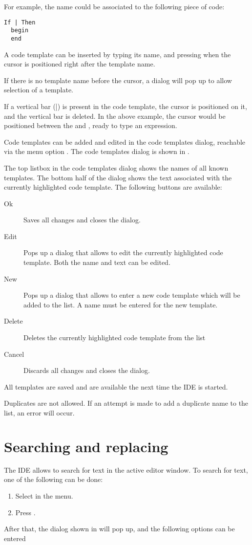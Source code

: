 For example, the name  could be associated to the following
piece of code:
\begin{verbatim}
If | Then
  begin
  end
\end{verbatim}
A code template can be inserted by typing its name, and pressing 
when the cursor is positioned right after the template name.

If there is no template name before the cursor, a dialog will pop up to
allow selection of a template.

If a vertical bar (|) is present in the code template, the cursor is positioned
on it, and the vertical bar is deleted. In the above example, the cursor would be
positioned between the  and , ready to type an expression.

Code templates can be added and edited in the code templates dialog, reachable via
the menu option .
The code templates dialog is shown in .


The top listbox in the code templates dialog shows the names of all 
known templates. The bottom half of the dialog shows the text associated
with the currently highlighted code template.
The following buttons are available:
\begin{description}
\item[Ok] Saves all changes and closes the dialog.
\item[Edit] Pops up a dialog that allows to edit the currently 
highlighted code template. Both the name and text can be edited.
\item[New] Pops up a dialog that allows to enter a new code template
which will be added to the list. A name must be entered for the new
template.
\item[Delete] Deletes the currently highlighted code template from the list
\item[Cancel] Discards all changes and closes the dialog.
\end{description}
All templates are saved and are available the next time the IDE is started.
\begin{remark}
Duplicates are not allowed. If an attempt is made to add a duplicate name
to the list, an error will occur.
\end{remark}

\section{Searching and replacing}
\label{se:searching}
The IDE allows to search for text in the active editor window. 
To search for text, one of the following can be done:
\begin{enumerate}
\item Select  in the menu.
\item Press .
\end{enumerate}
After that, the dialog shown in  will pop up,
and the following options can be entered


